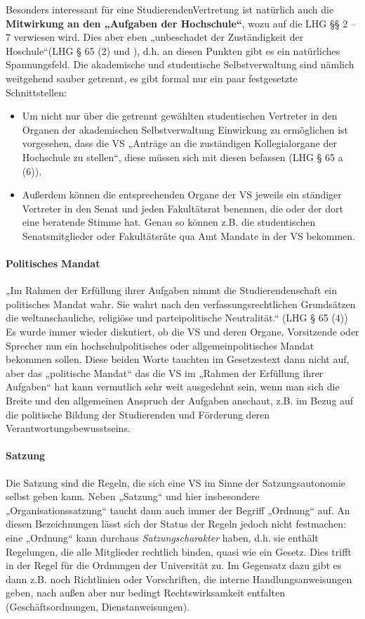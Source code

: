 \documentclass[
10pt,
a4paper,
twoside,								%
titlepage=false,							%
draft=false								%
]{scrartcl}
\begin{document}
Besonders interessant für eine StudierendenVertretung ist natürlich auch die \textbf{Mitwirkung an den „Aufgaben der Hochschule“}, wozu auf die LHG §§ 2 – 7 verwiesen wird. Dies aber eben „unbeschadet der Zuständigkeit der Hoschule“(LHG § 65 (2) und \emph{}), d.h. an diesen Punkten gibt es ein natürliches Spannungsfeld. Die akademische und studentische Selbstverwaltung sind nämlich weitgehend sauber getrennt, es gibt formal nur ein paar festgesetzte Schnittstellen:
\begin{itemize}
	\item Um nicht nur über die getrennt gewählten studentischen Vertreter in den Organen der akademischen Selbstverwaltung Einwirkung zu ermöglichen ist vorgesehen, dass die VS „Anträge an die zuständigen Kollegialorgane der Hochschule zu stellen“, diese müssen sich mit diesen befassen (LHG § 65 a (6)). 
	\item Außerdem können die entsprechenden Organe der VS jeweils ein ständiger Vertreter in den Senat und jeden Fakultätsrat benennen, die oder der dort eine beratende Stimme hat. Genau so können z.B. die studentischen Senatsmitglieder oder Fakultätsräte qua Amt Mandate in der VS bekommen.
\end{itemize}


\paragraph{Politisches Mandat}

„Im Rahmen der Erfüllung ihrer Aufgaben nimmt die Studierendenschaft ein politisches Mandat wahr. Sie wahrt nach den verfassungsrechtlichen Grundsätzen die weltanschauliche, religiöse und parteipolitische Neutralität.“ (LHG § 65 (4)) Es wurde immer wieder diskutiert, ob die VS und deren Organe, Vorsitzende oder Sprecher nun ein hochschulpolitisches oder allgemeinpolitisches Mandat bekommen sollen. Diese beiden Worte tauchten im Gesetzestext dann nicht auf, aber das „politische Mandat“ das die VS im „Rahmen der Erfüllung ihrer Aufgaben“ hat kann vermutlich sehr weit ausgedehnt sein, wenn man sich die Breite und den allgemeinen Anspruch der Aufgaben anschaut, z.B. im Bezug auf die politische Bildung der Studierenden und Förderung deren Verantwortungsbewusstseins.


\paragraph{Satzung}

Die Satzung sind die Regeln, die sich eine VS im Sinne der Satzungsautonomie selbst geben kann. Neben „Satzung“ und hier insbesondere „Organisationssatzung“ taucht dann auch immer der Begriff „Ordnung“ auf. An diesen Bezeichnungen lässt sich der Status der Regeln jedoch nicht festmachen: eine „Ordnung“ kann durchaus \emph{Satzungscharakter} haben, d.h. sie enthält Regelungen, die alle Mitglieder rechtlich binden, quasi wie ein Gesetz. Dies trifft in der Regel für die Ordnungen der Universität zu. Im Gegensatz dazu gibt es dann z.B. noch Richtlinien oder Vorschriften, die interne Handlungsanweisungen geben, nach außen aber nur bedingt Rechtswirksamkeit entfalten (Geschäftsordnungen, Dienstanweisungen).
\end{document}
